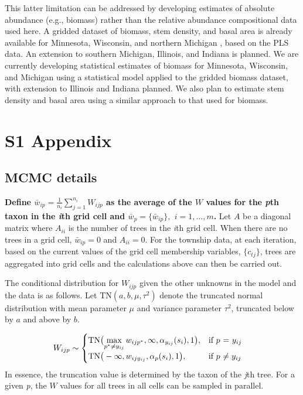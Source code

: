 \documentclass[10pt,letterpaper]{article}
\begin{document}
This latter limitation can be addressed by developing estimates of
absolute abundance (e.g., biomass) rather than the relative abundance
compositional data used here. A gridded dataset of biomass, stem density,
and basal area is already available for Minnesota, Wisconsin, and
northern Michigan \cite{goring2015tr}, based on the PLS
data. An extension to southern Michigan, Illinois, and Indiana is
planned. We are currently developing statistical estimates of biomass
for Minnesota, Wisconsin, and Michigan using a statistical model applied
to the gridded biomass dataset, with extension to Illinois and Indiana
planned. We also plan to estimate stem density and basal area using
a similar approach to that used for biomass. 


\section*{S1 Appendix}
\label{SI}

\subsection*{MCMC details}

{\bf Define $\bar{w}_{ip}=\frac{1}{n_{i}}{\displaystyle \sum_{j=1}^{n_{i}}W_{ijp}}$
as the average of the $W$ values for the \emph{p}th taxon in the \emph{i}th
grid cell and $\bar{w}_{p}=\{\bar{w}_{ip}\},$ $i=1,\ldots,m$.} Let
$A$ be a diagonal matrix where $A_{ii}$ is the number of trees in
the \emph{i}th grid cell. When there are no trees in a grid cell, $\bar{w}_{ip}=0$
and $A_{ii}=0$. For the township data, at each iteration, based on
the current values of the grid cell membership variables, $\{c_{tj}\}$,
trees are aggregated into grid cells and the calculations above can
then be carried out.

The conditional distribution for $W_{ijp}$ given the other unknowns
in the model and the data is as follows. Let $\mbox{TN}(a,b,\mu,\tau^{2})$
denote the truncated normal distribution with mean parameter $\mu$
and variance parameter $\tau^{2}$, truncated below by $a$ and above
by $b$. 

\begin{align}
W_{ijp} & \sim\begin{cases}
\mbox{TN}\big({\displaystyle \max_{p^{*}\neq y_{ij}}w_{ijp^{*}},\infty,\alpha_{y_{ij}}(s_{i}),1\big),} & \mbox{if }p\mbox{ = \ensuremath{y_{ij}}}\\
\mbox{TN}\big(-\infty,w_{ijy_{ij}},\alpha_{p}(s_{i}),1\big), & \mbox{if }p\mbox{ \ensuremath{\neq y_{ij}}}
\end{cases}
\end{align}
In essence, the truncation value is determined by the taxon of the
\emph{j}th tree. For a given \emph{p}, the $W$ values for all trees in all
cells can be sampled in parallel. 
\end{document}
